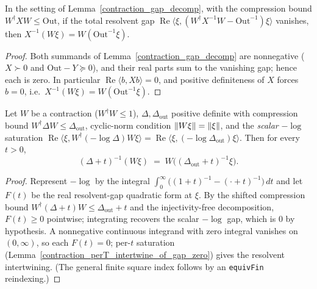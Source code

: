 \begin{lemma}\label{contraction_perT_intertwine_of_gap_zero}
  \leanok
  In the setting of Lemma~\ref{contraction_gap_decomp}, with the compression bound
  \(W^{\dagger}XW\le\mathrm{Out}\), if the total resolvent gap
  \(\operatorname{Re}\langle\xi,(W^{\dagger}X^{-1}W-\mathrm{Out}^{-1})\xi\rangle\) vanishes, then
  \(X^{-1}(W\xi)=W(\mathrm{Out}^{-1}\xi)\).
\end{lemma}
\begin{proof}\leanok
  Both summands of Lemma~\ref{contraction_gap_decomp} are nonnegative (\(X\succ 0\) and
  \(\mathrm{Out}-Y\succeq 0\)), and their real parts sum to the vanishing gap; hence each is zero. In
  particular \(\operatorname{Re}\langle b,Xb\rangle=0\), and positive definiteness of \(X\) forces
  \(b=0\), i.e.\ \(X^{-1}(W\xi)=W(\mathrm{Out}^{-1}\xi)\).
\end{proof}

\begin{theorem}\label{contraction_resolvent_intertwine_of_re_eq}
  \leanok
  Let \(W\) be a contraction (\(W^{\dagger}W\le 1\)), \(\Delta,\Delta_{\mathrm{out}}\) positive
  definite with compression bound \(W^{\dagger}\Delta W\le\Delta_{\mathrm{out}}\), cyclic-norm
  condition \(\left\lVert W\xi \right\rVert=\left\lVert \xi \right\rVert\), and the \emph{scalar} \(-\log\) saturation
  \(\operatorname{Re}\langle\xi,W^{\dagger}(-\log\Delta)W\xi\rangle
    =\operatorname{Re}\langle\xi,(-\log\Delta_{\mathrm{out}})\xi\rangle\).
  Then for every \(t>0\),
  \[
    (\Delta+t)^{-1}(W\xi) \;=\; W\bigl((\Delta_{\mathrm{out}}+t)^{-1}\xi\bigr).
  \]
\end{theorem}
\begin{proof}\leanok
  Represent \(-\log\) by the integral \(\int_0^\infty\bigl((1+t)^{-1}-(\cdot+t)^{-1}\bigr)\,dt\) and
  let \(F(t)\) be the real resolvent-gap quadratic form at \(\xi\). By the shifted compression bound
  \(W^{\dagger}(\Delta+t)W\le\Delta_{\mathrm{out}}+t\) and the injectivity-free decomposition,
  \(F(t)\ge 0\) pointwise; integrating recovers the scalar \(-\log\) gap, which is \(0\) by
  hypothesis. A nonnegative continuous integrand with zero integral vanishes on \((0,\infty)\), so
  each \(F(t)=0\); per-\(t\) saturation (Lemma~\ref{contraction_perT_intertwine_of_gap_zero}) gives
  the resolvent intertwining. (The general finite square index follows by an \texttt{equivFin}
  reindexing.)
\end{proof}

